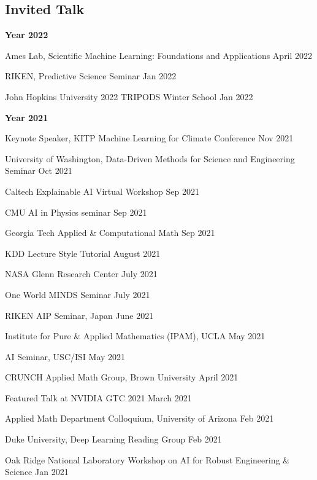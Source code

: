 \documentclass[margin,line]{res}
\begin{document}
\begin{resume}





\section{\sc Invited Talk}
 {\bf Year  2022}
 

Ames Lab, Scientific Machine Learning: Foundations and Applications \hfill{April 2022}
 
 RIKEN, Predictive Science Seminar \hfill{Jan 2022}
 
 John Hopkins University 2022 TRIPODS Winter School \hfill{Jan 2022}
 
 {\bf Year  2021}

Keynote Speaker,   KITP Machine Learning for Climate Conference \hfill{Nov 2021}

University of Washington,  Data-Driven Methods for Science and Engineering Seminar  \hfill{Oct 2021}

Caltech Explainable AI Virtual Workshop  \hfill{Sep 2021}


 CMU AI in Physics seminar \hfill{Sep 2021}
 
 Georgia Tech Applied \& Computational Math \hfill{Sep 2021}

 KDD Lecture Style Tutorial \hfill{August 2021}
 

 
NASA Glenn Research Center \hfill{July 2021}
 
One World MINDS Seminar \hfill{July 2021}

RIKEN AIP Seminar, Japan  \hfill{June 2021}
  
Institute for Pure \& Applied Mathematics (IPAM), UCLA \hfill{May 2021}

AI Seminar, USC/ISI \hfill{May 2021}

CRUNCH Applied Math Group,  Brown University \hfill{April 2021}
 
 Featured Talk at NVIDIA GTC 2021   \hfill{March 2021}
  
 Applied Math Department Colloquium, University of Arizona   \hfill{Feb 2021}
  
 Duke University, Deep Learning Reading Group \hfill{Feb 2021}

Oak Ridge National Laboratory Workshop on AI for Robust Engineering \& Science \hfill{Jan 2021}


\end{resume}
\end{document}
